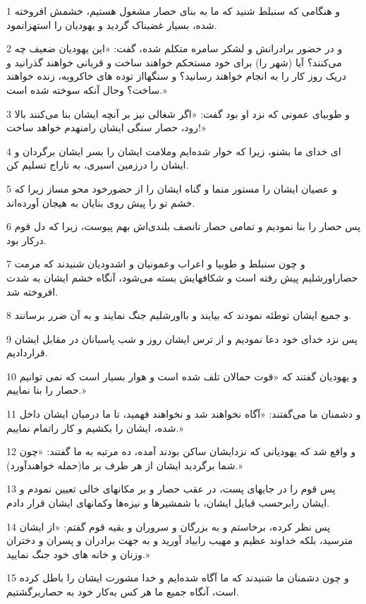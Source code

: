 \par 1 و هنگامی که سنبلط شنید که ما به بنای حصار مشغول هستیم، خشمش افروخته شده، بسیار غضبناک گردید و یهودیان را استهزانمود.
\par 2 و در حضور برادرانش و لشکر سامره متکلم شده، گفت: «این یهودیان ضعیف چه می‌کنند؟ آیا (شهر را) برای خود مستحکم خواهند ساخت و قربانی خواهند گذرانید و دریک روز کار را به انجام خواهند رسانید؟ و سنگهااز توده های خاکروبه، زنده خواهند ساخت؟ وحال آنکه سوخته شده است.»
\par 3 و طوبیای عمونی که نزد او بود گفت: «اگر شغالی نیز بر آنچه ایشان بنا می‌کنند بالا رود، حصار سنگی ایشان رامنهدم خواهد ساخت!»
\par 4 ‌ای خدای ما بشنو، زیرا که خوار شده‌ایم وملامت ایشان را بسر ایشان برگردان و ایشان را درزمین اسیری، به تاراج تسلیم کن.
\par 5 و عصیان ایشان را مستور منما و گناه ایشان را از حضورخود محو مساز زیرا که خشم تو را پیش روی بنایان به هیجان آورده‌اند.
\par 6 پس حصار را بنا نمودیم و تمامی حصار تانصف بلندی‌اش بهم پیوست، زیرا که دل قوم درکار بود.
\par 7 و چون سنبلط و طوبیا و اعراب وعمونیان و اشدودیان شنیدند که مرمت حصاراورشلیم پیش رفته است و شکافهایش بسته می‌شود، آنگاه خشم ایشان به شدت افروخته شد. 
\par 8 و جمیع ایشان توطئه نمودند که بیایند و بااورشلیم جنگ نمایند و به آن ضرر برسانند.
\par 9 پس نزد خدای خود دعا نمودیم و از ترس ایشان روز و شب پاسبانان در مقابل ایشان قراردادیم.
\par 10 و یهودیان گفتند که «قوت حمالان تلف شده است و هوار بسیار است که نمی توانیم حصار را بنا نماییم.»
\par 11 و دشمنان ما می‌گفتند: «آگاه نخواهند شد و نخواهند فهمید، تا ما درمیان ایشان داخل شده، ایشان را بکشیم و کار راتمام نماییم.»
\par 12 و واقع شد که یهودیانی که نزدایشان ساکن بودند آمده، ده مرتبه به ما گفتند: «چون شما برگردید ایشان از هر طرف بر ما(حمله خواهند‌آورد).»
\par 13 پس قوم را در جایهای پست، در عقب حصار و بر مکانهای خالی تعیین نمودم و ایشان رابرحسب قبایل ایشان، با شمشیرها و نیزه‌ها وکمانهای ایشان قرار دادم.
\par 14 پس نظر کرده، برخاستم و به بزرگان و سروران و بقیه قوم گفتم: «از ایشان مترسید، بلکه خداوند عظیم و مهیب رابیاد آورید و به جهت برادران و پسران و دختران وزنان و خانه های خود جنگ نمایید.»
\par 15 و چون دشمنان ما شنیدند که ما آگاه شده‌ایم و خدا مشورت ایشان را باطل کرده است، آنگاه جمیع ما هر کس به‌کار خود به حصاربرگشتیم.
